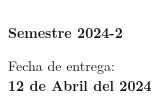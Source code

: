 \begin{titlepage}
\vspace{20mm}

\begin{minipage}{0.4\textwidth}
    \textcolor{white}{Semestre}\\
    \large\textbf{Semestre 2024-2}      
\end{minipage}
\begin{minipage}{0.4\textwidth}
    \begin{flushright}
        {\large Fecha de entrega:\\
         \textbf{12 de Abril del 2024}}
    \end{flushright}
\end{minipage}

\makeatother

\vfill 
\end{titlepage}
